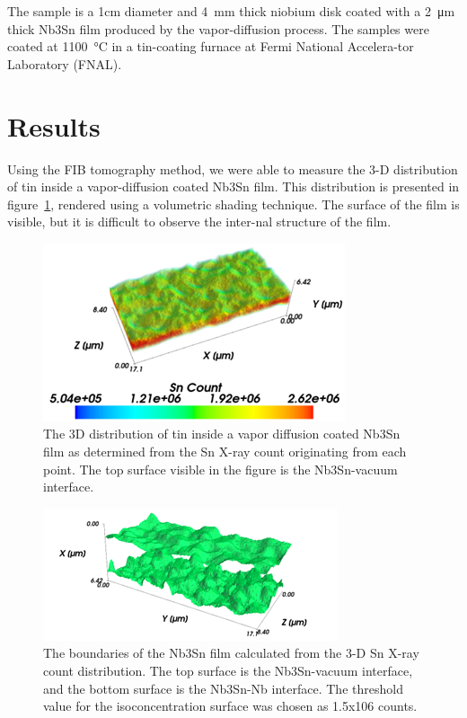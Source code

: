 The sample is a 1cm diameter and \qty{4}{\milli\meter} thick niobium disk coated with a \qty{2}{\micro\meter} thick Nb3Sn film produced by the vapor-diffusion process\cite{pudasaini2019growth}. The samples were coated at \qty{1100}{\celsius} in a tin-coating furnace at Fermi National Accelera-tor Laboratory (FNAL). 

\section{Results}

Using the FIB tomography method, we were able to measure the 3-D distribution of tin inside a vapor-diffusion coated Nb3Sn film. This distribution is presented in figure~\ref{fig:2}, rendered using a volumetric shading technique. The surface of the film is visible, but it is difficult to observe the inter-nal structure of the film.
 
\begin{figure}[htb]%
    \centering%
    \includegraphics[width=0.5\columnwidth]{../figs/Figure-2.png}%
    \caption{The 3D distribution of tin inside a vapor diffusion coated Nb3Sn film as determined from the Sn X-ray count originating from each point. The top surface visible in the figure is the Nb3Sn-vacuum interface.}%
    \label{fig:2}%
\end{figure}

\begin{figure}[htb]%
    \centering%
    \includegraphics[width=0.5\columnwidth]{../figs/Figure-3.png}%
    \caption{The boundaries of the Nb3Sn film calculated from the 3-D Sn X-ray count distribution. The top surface is the Nb3Sn-vacuum interface, and the bottom surface is the Nb3Sn-Nb interface. The threshold value for the isoconcentration surface was chosen as 1.5x106 counts.}%
    \label{fig:3}%
\end{figure}

